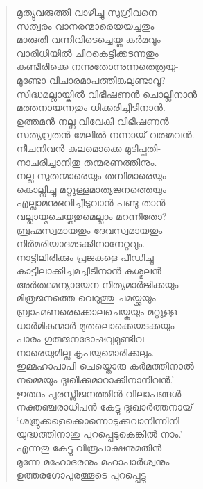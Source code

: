 \begin{verse}
മൃത്യുവരുത്തി വാഴിച്ചു സുഗ്രീവനെ\\
സത്വരം വാനരന്മാരെയയച്ചതും\\
മാരുതി വന്നിവിടെച്ചെയ്ത കര്‍മവും\\
വാരിധിയില്‍ ചിറകെട്ടിക്കടന്നതും\\
കണ്ടിരിക്കെ നന്നുതോന്നുന്നതെത്രയു-\\
മുണ്ടോ വിചാരമാപത്തിങ്കലുണ്ടാവൂ?\\
സിദ്ധമല്ലായ്കില്‍ വിഭീഷണന്‍ ചൊല്ലിനാന്‍\\
മത്തനായന്നതും ധിക്കരിച്ചീടിനാന്‍.\\
ഉത്തമന്‍ നല്ല വിവേകി വിഭീഷണന്‍\\
സത്യവ്രതന്‍ മേലില്‍ നന്നായ് വരുമവന്‍.\\
നീചനിവന്‍ കുലമൊക്കെ മുടിപ്പതി-\\
നാചരിച്ചാനിതു തന്മരണത്തിനും.\\
നല്ല സുതന്മാരെയും തമ്പിമാരെയും\\
കൊല്ലിച്ചു മറ്റുള്ളമാത്യജനത്തെയും\\
എല്ലാമനുഭവിച്ചീടുവാന്‍ പണ്ടു താന്‍\\
വല്ലായ്മചെയ്തതുമെല്ലാം മറന്നിതോ?\\
ബ്രഹ്മസ്വമായതും ദേവസ്വമായതും\\
നിര്‍മരിയാദമടക്കിനാനേറ്റവും.\\
നാട്ടിലിരിക്കും പ്രജകളെ പീഡിച്ചു\\
കാട്ടിലാക്കിച്ചമച്ചീടിനാന്‍ കശ്മലന്‍\\
അര്‍ത്ഥമന്യായേന നിത്യമാര്‍ജിക്കയും\\
മിത്രജനത്തെ വെറുത്തു ചമയ്ക്കയും\\
ബ്രാഹ്മണരെക്കൊലചെയ്കയും മറ്റുള്ള\\
ധാര്‍മികന്മാര്‍ മുതലൊക്കെയടക്കയും\\
പാരം ഗുരുജനദോഷവുമുണ്ടിവ-\\
നാരെയുമില്ല കൃപയുമൊരിക്കലും.\\
ഇമ്മഹാപാപി ചെയ്തൊരു കര്‍മത്തിനാല്‍\\
നമ്മെയും ദുഃഖിക്കുമാറാക്കിനാനിവന്‍.’\\
ഇത്ഥം പുരസ്ത്രീജനത്തിന്‍ വിലാപങ്ങള്‍\\
നക്തഞ്ചരാധിപന്‍ കേട്ടു ദുഃഖാര്‍ത്തനായ്\\
‘ശത്രുക്കളെക്കൊന്നൊടുക്കുവാനിന്നിനി\\
യുദ്ധത്തിനാശു പുറപ്പെടുകെങ്കില്‍ നാം.’\\
എന്നതു കേട്ടു വിരൂപാക്ഷനുമതിന്‍-\\
മുന്നേ മഹോദരനും മഹാപാര്‍ശ്വനും\\
ഉത്തരഗോപുരത്തൂടെ പുറപ്പെട്ടു\\

\end{verse}
